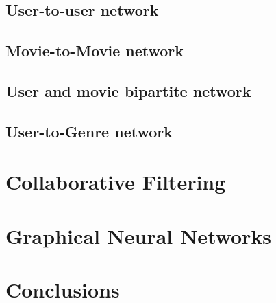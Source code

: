 \documentclass[12pt]{article}
\numberwithin{equation}{section}
\begin{document}
\subsection{User-to-user network}

\subsection{Movie-to-Movie network}

\subsection{User and movie bipartite network}

\subsection{User-to-Genre network}

\section{Collaborative Filtering}

\section{Graphical Neural Networks}

\newpage
\section{Conclusions}
\vspace{1em} 


%
%

\newpage
\printbibliography[heading=bibintoc]
\end{document}
